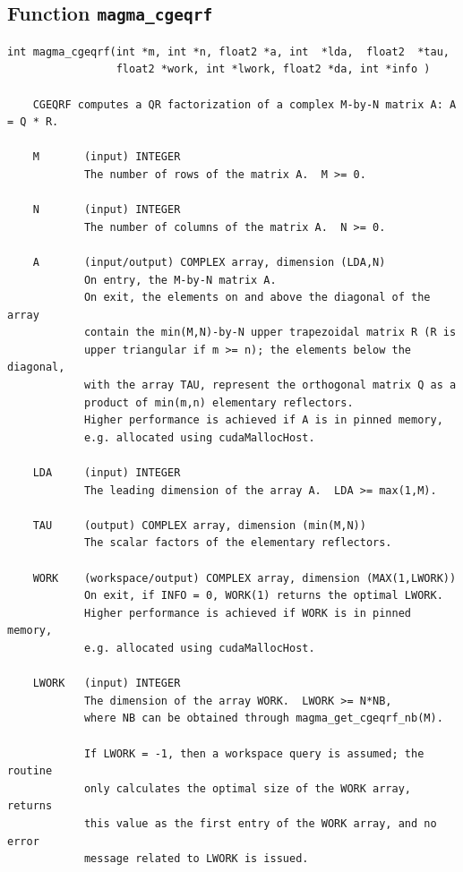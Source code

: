 \documentclass[10pt]{book}
\begin{document}
\subsection{Function {\tt {\bf magma\_cgeqrf}}}
\begin{verbatim}
int magma_cgeqrf(int *m, int *n, float2 *a, int  *lda,  float2  *tau,
                 float2 *work, int *lwork, float2 *da, int *info )
   
    CGEQRF computes a QR factorization of a complex M-by-N matrix A: A = Q * R.   

    M       (input) INTEGER   
            The number of rows of the matrix A.  M >= 0.   

    N       (input) INTEGER   
            The number of columns of the matrix A.  N >= 0.   

    A       (input/output) COMPLEX array, dimension (LDA,N)   
            On entry, the M-by-N matrix A.   
            On exit, the elements on and above the diagonal of the array   
            contain the min(M,N)-by-N upper trapezoidal matrix R (R is   
            upper triangular if m >= n); the elements below the diagonal,   
            with the array TAU, represent the orthogonal matrix Q as a   
            product of min(m,n) elementary reflectors.   
            Higher performance is achieved if A is in pinned memory, 
            e.g. allocated using cudaMallocHost.

    LDA     (input) INTEGER   
            The leading dimension of the array A.  LDA >= max(1,M).   

    TAU     (output) COMPLEX array, dimension (min(M,N))   
            The scalar factors of the elementary reflectors.   

    WORK    (workspace/output) COMPLEX array, dimension (MAX(1,LWORK))   
            On exit, if INFO = 0, WORK(1) returns the optimal LWORK.   
            Higher performance is achieved if WORK is in pinned memory, 
            e.g. allocated using cudaMallocHost.

    LWORK   (input) INTEGER   
            The dimension of the array WORK.  LWORK >= N*NB, 
            where NB can be obtained through magma_get_cgeqrf_nb(M).   

            If LWORK = -1, then a workspace query is assumed; the routine   
            only calculates the optimal size of the WORK array, returns   
            this value as the first entry of the WORK array, and no error   
            message related to LWORK is issued.


\end{verbatim}
\end{document}
